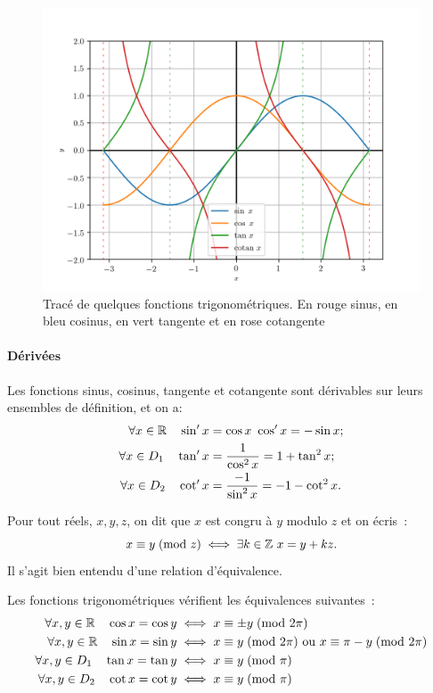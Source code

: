 \begin{figure}
  \centering
  \includegraphics[scale = 0.8]{trig.png}
  \caption[Tracé de quelques fonctions trigonométriques]{Tracé de quelques
  fonctions trigonométriques. En rouge sinus, en bleu cosinus, en vert
  tangente et en rose cotangente}\label{fig:tracetrigo}
\end{figure}

\paragraph{Dérivées}

Les fonctions sinus, cosinus, tangente et cotangente sont dérivables sur leurs
ensembles de définition, et on a:
\begin{align*}
  \forall x \in \mathbb{R} \quad \sin'x & = \cos x \ \cos'x = -\sin x; \\
  \forall x \in D_1 \quad \tan'x & = \frac{1}{\cos^2 x} = 1+\tan^2 x; \\
  \forall x \in D_2 \quad \cot'x & = \frac{-1}{\sin^2 x} = -1-\cot^2 x.
\end{align*}

\begin{defdef}[Congruence]
  Pour tout réels, \(x, y, z\), on dit que \(x\) est congru à \(y\) modulo
  \(z\) et on écris~:
  \begin{equation}
    x \equiv y\!\pmod {z} \iff \exists k \in \mathbb{Z} \ x = y + kz.
  \end{equation}
  Il s'agit bien entendu d'une relation d'équivalence.
\end{defdef}

\begin{prop}
  Les fonctions trigonométriques vérifient les équivalences suivantes~:
  \begin{align*}
    \forall x, y \in \mathbb{R} \quad \cos x = \cos y &\iff x \equiv \pm y\!\pmod {2\pi}\\
    \forall x, y \in \mathbb{R} \quad \sin x = \sin y &\iff x \equiv y\!\pmod {2\pi}
    \text{~ou~} x \equiv \pi-y\!\pmod {2\pi}\\
    \forall x, y \in D_1 \quad \tan x = \tan y &\iff x \equiv y\!\pmod {\pi}\\
    \forall x, y \in D_2 \quad \cot x = \cot y &\iff x \equiv y\!\pmod {\pi}
  \end{align*}
\end{prop}

